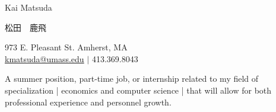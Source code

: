\documentclass {vangogh500-resume}
\begin{document}
\begin{namesection} {Kai} {Matsuda}
	\begin{CJK}{UTF8}{min}
	松田　鹿飛 \\
	\end{CJK}
	973 E. Pleasant St. Amherst, MA \\ 
	\href{mailto:kmatsuda@umass.edu}{kmatsuda@umass.edu} $|$ 413.369.8043
\end {namesection}

\noindent
\begin {objectivesection}
	A summer position, part-time job, or internship related to my field of specialization | economics and computer science | that will allow for both professional experience and personnel growth.
\end {objectivesection}
\end{document}
